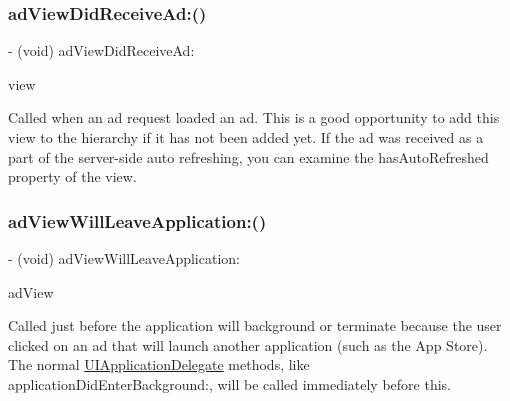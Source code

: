 \subsubsection{\texorpdfstring{ad\+View\+Did\+Receive\+Ad\+:()}{adViewDidReceiveAd:()}}
{\footnotesize\ttfamily -\/ (void) ad\+View\+Did\+Receive\+Ad\+: \begin{DoxyParamCaption}\item[{(\hyperlink{interfaceGADBannerView}{G\+A\+D\+Banner\+View} $\ast$)}]{view }\end{DoxyParamCaption}\hspace{0.3cm}{\ttfamily [optional]}}

Called when an ad request loaded an ad. This is a good opportunity to add this view to the hierarchy if it has not been added yet. If the ad was received as a part of the server-\/side auto refreshing, you can examine the has\+Auto\+Refreshed property of the view. \mbox{\label{protocolGADBannerViewDelegate-p_a68efb1e873d082dcf8fbbe94ccd7fb64}} 
\subsubsection{\texorpdfstring{ad\+View\+Will\+Leave\+Application\+:()}{adViewWillLeaveApplication:()}}
{\footnotesize\ttfamily -\/ (void) ad\+View\+Will\+Leave\+Application\+: \begin{DoxyParamCaption}\item[{(\hyperlink{interfaceGADBannerView}{G\+A\+D\+Banner\+View} $\ast$)}]{ad\+View }\end{DoxyParamCaption}\hspace{0.3cm}{\ttfamily [optional]}}

Called just before the application will background or terminate because the user clicked on an ad that will launch another application (such as the App Store). The normal \hyperlink{classUIApplicationDelegate-p}{U\+I\+Application\+Delegate} methods, like application\+Did\+Enter\+Background\+:, will be called immediately before this. \mbox{\label{protocolGADBannerViewDelegate-p_a00e5555f09391fd2d50f38b7c19d0f36}} 
